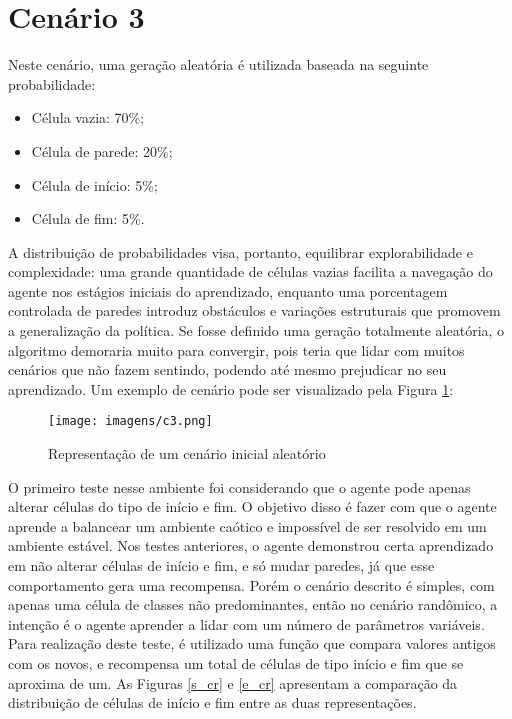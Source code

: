 \section{Cenário 3}
Neste cenário, uma geração aleatória é utilizada baseada na seguinte probabilidade:
\begin{itemize}
    \item Célula vazia: 70\%;
    \item Célula de parede: 20\%;
    \item Célula de início: 5\%;
    \item Célula de fim: 5\%.
\end{itemize}
A distribuição de probabilidades visa, portanto, equilibrar explorabilidade e complexidade: 
uma grande quantidade de células vazias facilita a navegação do agente nos estágios iniciais do aprendizado,
enquanto uma porcentagem controlada de paredes introduz obstáculos e variações estruturais que promovem a generalização da política.
Se fosse definido uma geração totalmente aleatória, o algoritmo demoraria muito para convergir, pois teria que lidar com muitos
cenários que não fazem sentindo, podendo até mesmo prejudicar no seu aprendizado. Um exemplo de cenário pode ser visualizado pela
Figura \ref{c3}:

\begin{figure}[htb]
	\caption{\label{c3}Representação de um cenário inicial aleatório}
	\begin{center}
	    \texttt{[image: imagens/c3.png]}
	\end{center}
\end{figure}

\FloatBarrier

O primeiro teste nesse ambiente foi considerando que o agente pode apenas alterar células do tipo de início e fim.
O objetivo disso é fazer com que o agente aprende a balancear um ambiente caótico e impossível de ser resolvido 
em um ambiente estável. Nos testes anteriores, o agente demonstrou certa aprendizado em não alterar células de 
início e fim, e só mudar paredes, já que esse comportamento gera uma recompensa. Porém o cenário descrito é simples,
com apenas uma célula de classes não predominantes, então no cenário randômico, a intenção é o agente aprender 
a lidar com um número de parâmetros variáveis. Para realização deste teste, é utilizado uma função que compara 
valores antigos com os novos, e recompensa um total de células de tipo início e fim que se aproxima de um.
As Figuras \ref{s_cr} e \ref{e_cr} apresentam a comparação da distribuição de células de início e fim entre as duas
representações.

